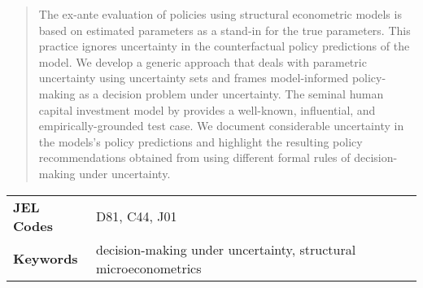 
\maketitle



\setcounter{page}{1}
\thispagestyle{empty}
\begin{abstract}\noindent
The ex-ante evaluation of policies using structural econometric models is based on estimated parameters as a stand-in for the true parameters. This practice ignores uncertainty in the counterfactual policy predictions of the model. We develop a generic approach that deals with parametric uncertainty using uncertainty sets and frames model-informed policy-making as a decision problem under uncertainty. The seminal human capital investment model by \citet{Keane.1997} provides a well-known, influential, and empirically-grounded test case. We document considerable uncertainty in the models's policy predictions and highlight the resulting policy recommendations obtained from using different formal rules of decision-making under uncertainty.\\
\end{abstract}


\noindent\begin{tabular}{@{\hspace{0.5cm}}ll}
\textbf{JEL Codes} & D81, C44, J01\\
\textbf{Keywords}  & decision-making under uncertainty, structural microeconometrics
\end{tabular}



\newpage\tableofcontents\clearpage
